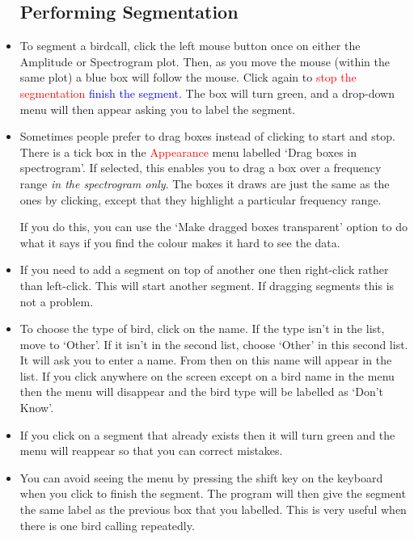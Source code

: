 \documentclass{article}
\begin{document}
\begin{itemize}
\subsection{Performing Segmentation}

\item To segment a birdcall, click the left mouse button once on either the Amplitude or Spectrogram plot. Then, as you move the mouse (within the same plot) a blue box will follow the mouse. Click again to \textcolor{red}{stop the segmentation} \textcolor{blue}{finish the segment}. The box will turn green, and a drop-down menu will then appear asking you to label the segment. 

\item Sometimes people prefer to drag boxes instead of clicking to start and stop. There is a tick box in the \textcolor{red}{Appearance} menu labelled `Drag boxes in spectrogram'. If selected, this enables you to drag a box over a frequency range {\em in the spectrogram only}. The boxes it draws are just the same as the ones by clicking, except that they highlight a particular frequency range. 

If you do this, you can use the `Make dragged boxes transparent' option to do what it says if you find the colour makes it hard to see the data.

\item If you need to add a segment on top of another one then right-click rather than left-click. This will start another segment. If dragging segments this is not a problem. 

\item To choose the type of bird, click on the name. If the type isn't in the list, move to `Other'. If it isn't in the second list, choose `Other' in this second list. It will ask you to enter a name. From then on this name will appear in the list. If you click anywhere on the screen except on a bird name in the menu then the menu will disappear and the bird type will be labelled as `Don't Know'.

\item If you click on a segment that already exists then it will turn green and the menu will reappear so that you can correct mistakes.

\item You can avoid seeing the menu by pressing the shift key on the keyboard when you click to finish the segment. The program will then give the segment the same label as the previous box that you labelled. This is very useful when there is one bird calling repeatedly.


\end{itemize}
\end{document}
